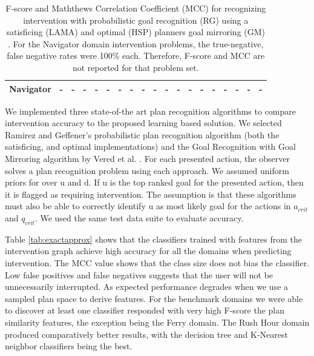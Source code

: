 \documentclass[letterpaper]{article}
\theoremstyle{plain}
\begin{document}
\begin{table}[tb]
{\begin{tabular}{|l|ll|ll|ll|ll|ll|ll|ll|ll|ll|}
\textbf{Navigator}                            & -                       & -                        & -                       & -   & -                       & -   & -                        & -   & -                       & -   & -                       & -   & -                        & -   & -                       & -   & -                       & -   \\ \hline
\end{tabular}%
}
\caption{F-score and Maththews Correlation Coefficient (MCC) for recognizing intervention with probabilistic goal recognition (RG)  \cite{ramirez2010probabilistic} using a satisficing (LAMA) and optimal (HSP) planners goal mirroring (GM) \cite{vered2018goalrec}. For the Navigator domain intervention problems, the true-negative, false negative rates were 100\%  each. Therefore, F-score and MCC are not reported for that problem set.}
\label{tab:rgv}
\end{table}

We implemented three state-of-the art plan recognition algorithms to compare intervention accuracy to the proposed learning based solution. We selected Ramirez and Geffener's probabilistic plan recognition algorithm \cite{ramirez2010probabilistic} (both the satisficing, and optimal implementations) and the Goal Recognition with Goal Mirroring algorithm by Vered et al. . 
For each presented action, the observer solves a plan recognition problem using each approach. We assumed uniform priors for over $\mathrm{u}$ and $\mathrm{d}$. If $\mathrm{u}$ is the top ranked goal for the presented action, then it is flagged as requiring intervention. The assumption is that these algorithms must also be able to correctly identify $\mathrm{u}$ as most likely goal for the actions in $a_{crit}$ and $q_{crit}$. We used the same test data suite to evaluate accuracy.

Table \ref{tab:exactapprox} shows that the classifiers trained with features from the intervention graph achieve high accuracy for all the domains when predicting intervention. The MCC value shows that the class size does not bias the classifier. Low false positives and false negatives suggests that the user will not be unnecessarily interrupted. As expected performance degrades when we use a sampled plan space to derive features. For the benchmark domains we were able to discover at least one classifier responded with very high F-score the plan similarity features, the exception being the Ferry domain. The Rush Hour domain produced comparatively better results, with the decision tree and K-Nearest neighbor classifiers being the best. 
\end{document}
